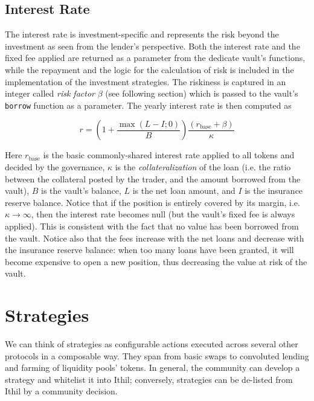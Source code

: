 \documentclass[a4paper,10 pt]{article}
\theoremstyle{definition}
\begin{document}
\subsection{Interest Rate}

The interest rate is investment-specific and represents the risk beyond the investment as seen from the lender's perspective.
Both the interest rate and the fixed fee applied are returned as a parameter from the dedicate vault's functions, while the repayment and the logic for the calculation of risk is included in the implementation of the investment strategies. The riskiness is captured in an integer called {\it risk factor} $\beta$ (see following section) which is passed to the vault's \verb|borrow| function as a parameter. The yearly interest rate is then computed as

\begin{equation}\label{interestrate}r =  \left(1+\frac{\max{(L-I;0)}}{B}\right)\frac{(r_{\text{base}} + \beta)}{\kappa}\end{equation}

Here $r_{\text{base}}$ is the basic commonly-shared interest rate applied to all tokens and decided by the governance, $\kappa$ is the {\it collateralization} of the loan (i.e. the ratio between the collateral posted by the trader, and the amount borrowed from the vault), $B$ is the vault's balance, $L$ is the net loan amount, and $I$ is the insurance reserve balance. Notice that if the position is entirely covered by its margin, i.e. $\kappa \rightarrow \infty$, then the interest rate becomes null (but the vault's fixed fee is always applied). This is consistent with the fact that no value has been borrowed from the vault. Notice also that the fees increase with the net loans and decrease with the insurance reserve balance: when too many loans have been granted, it will become expensive to open a new position, thus decreasing the value at risk of the vault.

\section{Strategies}
We can think of strategies as configurable actions executed across several other protocols in a composable way. They span from basic swaps to convoluted lending and farming of liquidity pools' tokens. In general, the community can develop a strategy and whitelist it into Ithil; conversely, strategies can be de-listed from Ithil by a community decision.
\end{document}
